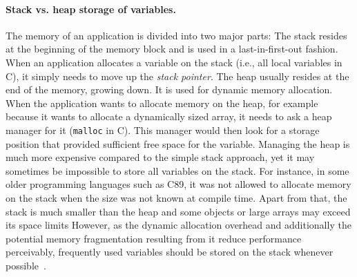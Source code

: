 \paragraph{Stack vs. heap storage of variables.} The memory of an application is divided into two major parts: The stack resides at the beginning of the memory block and is used in a last-in-first-out fashion. When an application allocates a variable on the stack (i.e., all local variables in C), it simply needs to move up the \emph{stack pointer}. The heap usually resides at the end of the memory, growing down. It is used for dynamic memory allocation. When the application wants to allocate memory on the heap, for example because it wants to allocate a dynamically sized array, it needs to ask a heap manager for it (\texttt{malloc} in C). This manager would then look for a storage position that provided sufficient free space for the variable. Managing the heap is much more expensive compared to the simple stack approach, yet it may sometimes be impossible to store all variables on the stack. For instance, in some older programming languages such as C89, it was not allowed to allocate memory on the stack when the size was not known at compile time. Apart from that, the stack is much smaller than the heap and some objects or large arrays may exceed its space limits However, as the dynamic allocation overhead and additionally the potential memory fragmentation resulting from it reduce performance perceivably, frequently used variables should be stored on the stack whenever possible~\cite[p. 90]{fog2011optimizing}.
